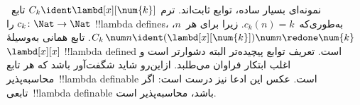 \documentclass[../../../include/open-logic-section]{subfiles}
\begin{document}
نمونه‌ای بسیار ساده، توابع ثابت‌اند. ترم
$C_k \ident \lambd[x][\num{k}]$ تابع~$c_k\colon \Nat \to \Nat$ را
!!{lambda define}s، به‌طوری‌که~$c_k(n) = k$. زیرا برای هر~$n$،
$C_k \, \num n \ident (\lambd[x][\num{k}])\num n \redone \num{k}$.
تابع همانی به‌وسیلهٔ~$\lambd[x][x]$ !!{lambda defined} است. تعریف توابع
پیچیده‌تر البته دشوارتر است و اغلب ابتکار فراوان می‌طلبد. ازاین‌رو شاید
شگفت‌آور باشد که هر تابع محاسبه‌پذیر~!!{lambda definable} است. عکس این
ادعا نیز درست است: اگر تابعی~!!{lambda definable} باشد، محاسبه‌پذیر است.
\end{document}
